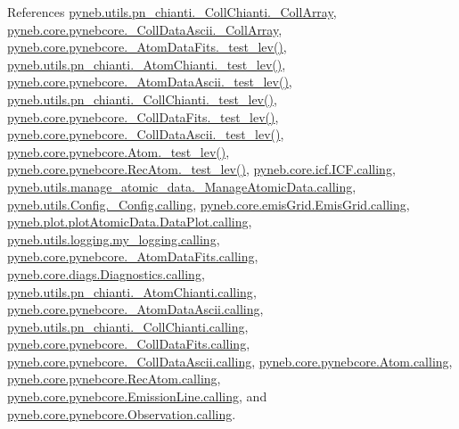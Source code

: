 References \hyperlink{pn__chianti_8py_source_l00433}{pyneb.\+utils.\+pn\+\_\+chianti.\+\_\+\+Coll\+Chianti.\+\_\+\+Coll\+Array}, \hyperlink{pynebcore_8py_source_l00987}{pyneb.\+core.\+pynebcore.\+\_\+\+Coll\+Data\+Ascii.\+\_\+\+Coll\+Array}, \hyperlink{pynebcore_8py_source_l00171}{pyneb.\+core.\+pynebcore.\+\_\+\+Atom\+Data\+Fits.\+\_\+test\+\_\+lev()}, \hyperlink{pn__chianti_8py_source_l00284}{pyneb.\+utils.\+pn\+\_\+chianti.\+\_\+\+Atom\+Chianti.\+\_\+test\+\_\+lev()}, \hyperlink{pynebcore_8py_source_l00435}{pyneb.\+core.\+pynebcore.\+\_\+\+Atom\+Data\+Ascii.\+\_\+test\+\_\+lev()}, \hyperlink{pn__chianti_8py_source_l00449}{pyneb.\+utils.\+pn\+\_\+chianti.\+\_\+\+Coll\+Chianti.\+\_\+test\+\_\+lev()}, \hyperlink{pynebcore_8py_source_l00660}{pyneb.\+core.\+pynebcore.\+\_\+\+Coll\+Data\+Fits.\+\_\+test\+\_\+lev()}, \hyperlink{pynebcore_8py_source_l01026}{pyneb.\+core.\+pynebcore.\+\_\+\+Coll\+Data\+Ascii.\+\_\+test\+\_\+lev()}, \hyperlink{pynebcore_8py_source_l01459}{pyneb.\+core.\+pynebcore.\+Atom.\+\_\+test\+\_\+lev()}, \hyperlink{pynebcore_8py_source_l02596}{pyneb.\+core.\+pynebcore.\+Rec\+Atom.\+\_\+test\+\_\+lev()}, \hyperlink{icf_8py_source_l00016}{pyneb.\+core.\+icf.\+I\+C\+F.\+calling}, \hyperlink{manage__atomic__data_8py_source_l00018}{pyneb.\+utils.\+manage\+\_\+atomic\+\_\+data.\+\_\+\+Manage\+Atomic\+Data.\+calling}, \hyperlink{_config_8py_source_l00032}{pyneb.\+utils.\+Config.\+\_\+\+Config.\+calling}, \hyperlink{emis_grid_8py_source_l00041}{pyneb.\+core.\+emis\+Grid.\+Emis\+Grid.\+calling}, \hyperlink{plot_atomic_data_8py_source_l00042}{pyneb.\+plot.\+plot\+Atomic\+Data.\+Data\+Plot.\+calling}, \hyperlink{logging_8py_source_l00044}{pyneb.\+utils.\+logging.\+my\+\_\+logging.\+calling}, \hyperlink{pynebcore_8py_source_l00090}{pyneb.\+core.\+pynebcore.\+\_\+\+Atom\+Data\+Fits.\+calling}, \hyperlink{diags_8py_source_l00169}{pyneb.\+core.\+diags.\+Diagnostics.\+calling}, \hyperlink{pn__chianti_8py_source_l00223}{pyneb.\+utils.\+pn\+\_\+chianti.\+\_\+\+Atom\+Chianti.\+calling}, \hyperlink{pynebcore_8py_source_l00311}{pyneb.\+core.\+pynebcore.\+\_\+\+Atom\+Data\+Ascii.\+calling}, \hyperlink{pn__chianti_8py_source_l00414}{pyneb.\+utils.\+pn\+\_\+chianti.\+\_\+\+Coll\+Chianti.\+calling}, \hyperlink{pynebcore_8py_source_l00568}{pyneb.\+core.\+pynebcore.\+\_\+\+Coll\+Data\+Fits.\+calling}, \hyperlink{pynebcore_8py_source_l00918}{pyneb.\+core.\+pynebcore.\+\_\+\+Coll\+Data\+Ascii.\+calling}, \hyperlink{pynebcore_8py_source_l01175}{pyneb.\+core.\+pynebcore.\+Atom.\+calling}, \hyperlink{pynebcore_8py_source_l02572}{pyneb.\+core.\+pynebcore.\+Rec\+Atom.\+calling}, \hyperlink{pynebcore_8py_source_l03263}{pyneb.\+core.\+pynebcore.\+Emission\+Line.\+calling}, and \hyperlink{pynebcore_8py_source_l03419}{pyneb.\+core.\+pynebcore.\+Observation.\+calling}.


